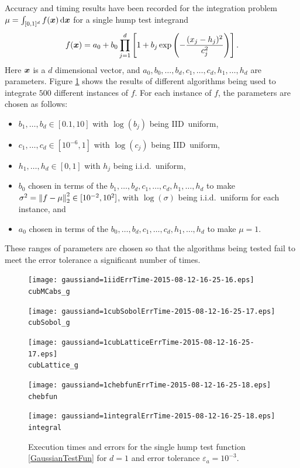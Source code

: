 \documentclass{iitthesis}
\theoremstyle{definition}
\begin{document}
\label{subsec:meanmcabssinglehump}
Accuracy and timing results have been recorded for the integration problem $\mu=\int_{[0,1]^d} f(\vx) \, \dif \vx$ for a single hump test integrand
\begin{equation} \label{GaussianTestFun}
f(\vx)=a_0 + b_0\prod_{j=1}^d\left[ 1 +b_j \exp \left(-\frac{(x_j-h_j)^2}{c_j^2}\right) \right].
\end{equation}
Here $\vx$ is a $d$ dimensional vector, and $a_0, b_0, \ldots, b_d, c_1, \ldots, c_d, h_1, \ldots, h_d$ are parameters. Figure \ref{fig:GaussianTestFun} shows the results of different algorithms being used to integrate $500$ different instances of $f$.  For each instance of $f$, the parameters are chosen as follows:
\begin{itemize} 
\item $b_1, \ldots, b_d \in [0.1,10]$ with $\log(b_j)$ being IID\ uniform,
\item $c_1, \ldots, c_d \in [10^{-6},1]$ with $\log(c_j)$ being IID\ uniform,
\item $h_1, \ldots, h_d \in [0,1]$ with $h_j$ being i.i.d.\ uniform,
\item $b_0$ chosen in terms of the $b_1, \ldots, b_d, c_1, \ldots, c_d, h_1, \ldots, h_d$ to make $\sigma^2 =\norm[2]{f-\mu}^2 \in [10^{-2}, 10^2]$, with $\log(\sigma)$ being i.i.d.\ uniform for each instance, and
\item $a_0$ chosen in terms of the $b_0, \ldots, b_d, c_1, \ldots, c_d, h_1, \ldots, h_d$ to make $\mu=1$.
\end{itemize}
These ranges of parameters are chosen so that the algorithms being tested fail to meet the error tolerance a significant number of times.
\begin{figure}
\centering
\begin{minipage}{9cm} \centering \texttt{[image: gaussiand=1iidErrTime-2015-08-12-16-25-16.eps]} \\ {\tt cubMCabs\_g}  \end{minipage}
\begin{minipage}{7cm} \centering \texttt{[image: gaussiand=1cubSobolErrTime-2015-08-12-16-25-17.eps]} \\  {\tt cubSobol\_g}\end{minipage}
\begin{minipage}{7cm} \centering \texttt{[image: gaussiand=1cubLatticeErrTime-2015-08-12-16-25-17.eps]} \\ {\tt cubLattice\_g} \end{minipage}
\begin{minipage}{7cm} \centering \texttt{[image: gaussiand=1chebfunErrTime-2015-08-12-16-25-18.eps]} \\ {\tt chebfun} \end{minipage}
\begin{minipage}{7cm} \centering \texttt{[image: gaussiand=1integralErrTime-2015-08-12-16-25-18.eps]} \\ {\tt integral} \end{minipage}
\caption{Execution times and errors for the single hump test function \eqref{GaussianTestFun} for $d=1$ and error tolerance $\varepsilon_a=10^{-3}$. \label{fig:GaussianTestFun} }
\end{figure}
\end{document}
